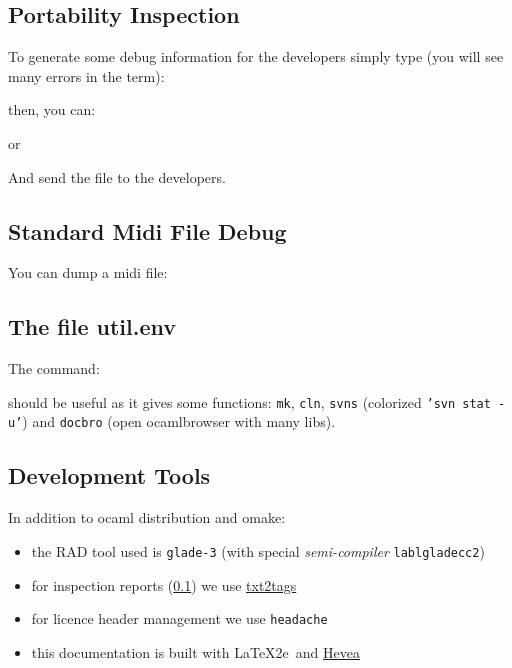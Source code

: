 \subsection{Portability Inspection}
\label{sec:inspect}

To generate some debug information for the developers simply type (you will see
many errors in the term):


then, you can:


or


And send the file  to the developers.

\subsection{Standard Midi File Debug}
You can dump a midi file:


\subsection{The file util.env}
The command:


should be useful as it gives some functions:
\texttt{mk}, \texttt{cln}, \texttt{svns} (colorized \texttt{'svn stat -u'}) and
\texttt{docbro} (open ocamlbrowser with many libs).

\subsection{Development Tools}

In addition to ocaml distribution and omake:

\begin{itemize}
  \item the RAD tool used is \texttt{glade-3} (with special
  \textit{semi-compiler} \texttt{lablgladecc2})
  \item for inspection reports (\ref{sec:inspect}) we use
  \href{http://txt2tags.sourceforge.net/}{txt2tags}
  \item for licence header management we use \texttt{headache}
  \item this documentation is built with \LaTeX2e\ and 
  \href{http://hevea.inria.fr/}{Hevea}
\end{itemize}

